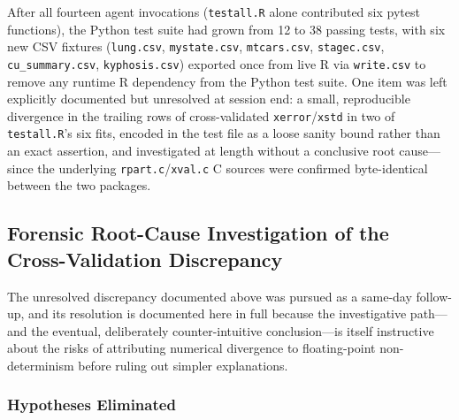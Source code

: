 \documentclass[12pt]{article}
\begin{document}
After all fourteen agent invocations (\texttt{testall.R} alone contributed six pytest functions), the Python test suite had grown from 12 to 38 passing tests, with six new CSV fixtures (\texttt{lung.csv}, \texttt{mystate.csv}, \texttt{mtcars.csv}, \texttt{stagec.csv}, \texttt{cu\_summary.csv}, \texttt{kyphosis.csv}) exported once from live R via \texttt{write.csv} to remove any runtime R dependency from the Python test suite. One item was left explicitly documented but unresolved at session end: a small, reproducible divergence in the trailing rows of cross-validated \texttt{xerror}/\texttt{xstd} in two of \texttt{testall.R}'s six fits, encoded in the test file as a loose sanity bound rather than an exact assertion, and investigated at length without a conclusive root cause---since the underlying \texttt{rpart.c}/\texttt{xval.c} C sources were confirmed byte-identical between the two packages.

\subsection{Forensic Root-Cause Investigation of the Cross-Validation Discrepancy}

The unresolved discrepancy documented above was pursued as a same-day follow-up, and its resolution is documented here in full because the investigative path---and the eventual, deliberately counter-intuitive conclusion---is itself instructive about the risks of attributing numerical divergence to floating-point non-determinism before ruling out simpler explanations.

\subsubsection{Hypotheses Eliminated}
\end{document}
